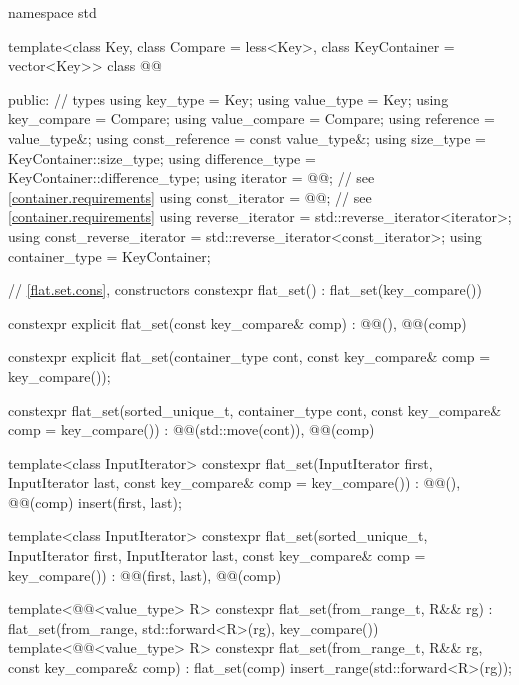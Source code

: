 \begin{codeblock}
namespace std {
  template<class Key, class Compare = less<Key>, class KeyContainer = vector<Key>>
  class @@ {
  public:
    // types
    using key_type                  = Key;
    using value_type                = Key;
    using key_compare               = Compare;
    using value_compare             = Compare;
    using reference                 = value_type&;
    using const_reference           = const value_type&;
    using size_type                 = KeyContainer::size_type;
    using difference_type           = KeyContainer::difference_type;
    using iterator                  = @@;  // see \ref{container.requirements}
    using const_iterator            = @@;  // see \ref{container.requirements}
    using reverse_iterator          = std::reverse_iterator<iterator>;
    using const_reverse_iterator    = std::reverse_iterator<const_iterator>;
    using container_type            = KeyContainer;

    // \ref{flat.set.cons}, constructors
    constexpr flat_set() : flat_set(key_compare()) { }

    constexpr explicit flat_set(const key_compare& comp)
      : @@(), @@(comp) { }

    constexpr explicit flat_set(container_type cont, const key_compare& comp = key_compare());

    constexpr flat_set(sorted_unique_t, container_type cont,
                       const key_compare& comp = key_compare())
      : @@(std::move(cont)), @@(comp) { }

    template<class InputIterator>
      constexpr flat_set(InputIterator first, InputIterator last,
                         const key_compare& comp = key_compare())
        : @@(), @@(comp)
        { insert(first, last); }

    template<class InputIterator>
      constexpr flat_set(sorted_unique_t, InputIterator first, InputIterator last,
               const key_compare& comp = key_compare())
        : @@(first, last), @@(comp) { }

    template<@@<value_type> R>
      constexpr flat_set(from_range_t, R&& rg)
        : flat_set(from_range, std::forward<R>(rg), key_compare()) { }
    template<@@<value_type> R>
      constexpr flat_set(from_range_t, R&& rg, const key_compare& comp)
        : flat_set(comp)
        { insert_range(std::forward<R>(rg)); }

}}
\end{codeblock}
